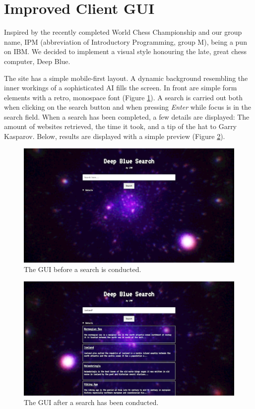 \section{Improved Client GUI}
Inspired by the recently completed World Chess Championship and our group name, IPM (abbreviation of Introductory Programming, group M), being a pun on IBM. We decided to implement a visual style honouring the late, great chess computer, Deep Blue.

The site has a simple mobile-first layout. A dynamic background resembling the inner workings of a sophisticated AI fills the screen. In front are simple form elements with a retro, monospace font (Figure \ref{fig:gui:noResults}). A search is carried out both when clicking on the search button and when pressing \textit{Enter} while focus is in the search field. When a search has been completed, a few details are displayed: The amount of websites retrieved, the time it took, and a tip of the hat to Garry Kasparov. Below, results are displayed with a simple preview (Figure \ref{fig:gui:results}). 

\begin{figure}
	\centering
	\includegraphics[width=\textwidth]{graphics/gui-noResults.png}
	\caption{The GUI before a search is conducted.}
	\label{fig:gui:noResults}
\end{figure}

\begin{figure}
	\centering
	\includegraphics[width=\textwidth]{graphics/gui.png}
	\caption{The GUI after a search has been conducted.}
	\label{fig:gui:results}
\end{figure}